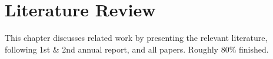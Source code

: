 \chapter{Literature Review}
This chapter discusses related work by presenting the relevant literature, following 1st \& 2nd annual report, and all papers. Roughly 80\% finished.

